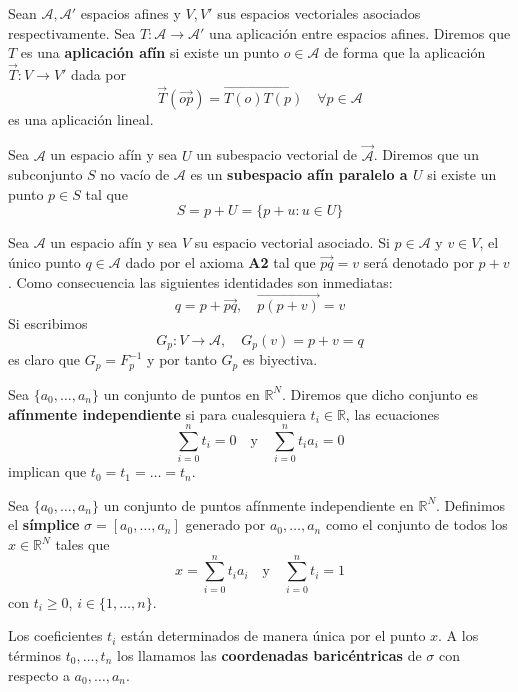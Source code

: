 \begin{definicion}
	Sean $\mathcal{A}, \mathcal{A'}$ espacios afines y $V,V'$ sus espacios vectoriales 
	asociados respectivamente. Sea $T: \mathcal{A} \rightarrow \mathcal{A'}$ una aplicación 
	entre espacios afines. Diremos que $T$ es una \textbf{aplicación afín} si existe 
	un punto $o \in \mathcal{A}$ de forma que la aplicación $\vec{T}: V \rightarrow V'$ 
	dada por
	\[ \vec{T}(\overrightarrow{op}) = \overrightarrow{T(o)T(p)} \quad \forall p \in \mathcal{A} \]
	es una aplicación lineal.
\end{definicion}

\begin{definicion}
	Sea $\mathcal{A}$ un espacio afín y sea $U$ un subespacio vectorial de $\vec{\mathcal{A}}$. Diremos que un subconjunto $S$ no vacío de $\mathcal{A}$ es un \textbf{subespacio afín paralelo a $U$} si existe un punto $p \in S$ tal que
	\[ S = p + U = \{p + u : u \in U\}\]
\end{definicion}

\begin{definicion}
	Sea $\mathcal{A}$ un espacio afín y sea $V$ su espacio vectorial asociado. Si $p \in \mathcal{A}$ y $v \in V$, el único punto $q \in \mathcal{A}$ dado por el axioma \textbf{A2} tal que $\overrightarrow{pq} = v$ será denotado por $p + v$. Como consecuencia las siguientes identidades son inmediatas:
	\[ q = p + \overrightarrow{pq}, \quad \overrightarrow{p(p+v)}=v \]
	Si escribimos
	\[ G_p: V \rightarrow \mathcal{A}, \quad G_p(v) = p + v = q \]
	es claro que $G_p = F_p^{-1}$ y por tanto $G_p$ es biyectiva.
\end{definicion}

\begin{definicion}
	Sea $\{a_0, \dots, a_n\}$ un conjunto de puntos en $\mathbb{R}^N$. 
	Diremos que dicho conjunto es \textbf{afínmente independiente} si 
	para cualesquiera $t_i \in \mathbb{R}$, las ecuaciones
	\[ \sum_{i=0}^{n}t_i=0 \quad \text{y} \quad \sum_{i=0}^{n}t_ia_i=0 \]
	implican que $t_0 = t_1 = \dots = t_n$.
\end{definicion}

\begin{definicion}
	Sea $\{a_0, \dots, a_n\}$ un conjunto de puntos afínmente independiente en 
	$\mathbb{R}^N$. Definimos el \textbf{símplice} $\sigma = [a_0, \dots, a_n]$ 
	generado por $a_0, 	\dots, a_n$ como el conjunto de todos los $x \in \mathbb{R}^N$ 
	tales que
	\[ x=\sum_{i=0}^{n}t_ia_i \quad \text{y} \quad \sum_{i=0}^{n}t_i=1 \]
	con $t_i \geq 0$, $i \in \{1, \dots, n\}$.
\end{definicion}
Los coeficientes $t_i$ están determinados de manera única por el punto $x$. A los términos  
$t_0, \dots, t_n$ los llamamos las \textbf{coordenadas baricéntricas} de $\sigma$
con respecto a $a_0, \dots, a_n$.

